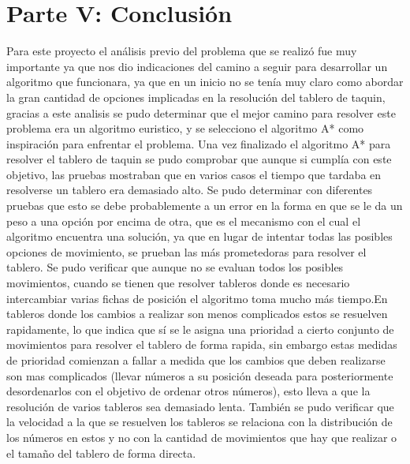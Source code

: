 \documentclass{article}
\begin{document}
\section{Parte V: Conclusión}
Para este proyecto el análisis previo del problema que se realizó fue muy importante ya que nos dio indicaciones del camino a seguir para desarrollar un algoritmo que funcionara, ya que en un inicio no se tenía muy claro como abordar la gran cantidad de opciones implicadas en la resolución del tablero de taquin, gracias a este analisis se pudo determinar que el mejor camino para resolver este problema era un algoritmo euristico, y se selecciono el algoritmo A* como inspiración para enfrentar el problema. 
Una vez finalizado el algoritmo A* para resolver el tablero de taquin se pudo comprobar que aunque si cumplía con este objetivo, las pruebas mostraban que en varios casos el tiempo que tardaba en resolverse un tablero era demasiado alto. Se pudo determinar con diferentes pruebas que esto se debe probablemente a un error en la forma en que se le da un peso a una opción por encima de otra, que es el mecanismo con el cual el algoritmo encuentra una solución, ya que en lugar de intentar todas las posibles opciones de movimiento, se prueban las más prometedoras para resolver el tablero. 
Se pudo verificar que aunque no se evaluan todos los posibles movimientos, cuando se tienen que resolver tableros donde es necesario intercambiar varias fichas de posición el algoritmo toma mucho más tiempo.En tableros donde los cambios a realizar son menos complicados estos se resuelven rapidamente, lo que indica que sí se le asigna una prioridad a cierto conjunto de movimientos para resolver el tablero de forma rapida, sin embargo estas medidas de prioridad comienzan a fallar a medida que los cambios que deben realizarse son mas complicados (llevar números a su posición deseada para posteriormente desordenarlos con el objetivo de ordenar otros números), esto lleva a que la resolución de varios tableros sea demasiado lenta. También se pudo verificar que la velocidad a la que se resuelven los tableros se relaciona con la distribución de los números en estos y no con la cantidad de movimientos que hay que realizar o el tamaño del tablero de forma directa. 
\end{document}
